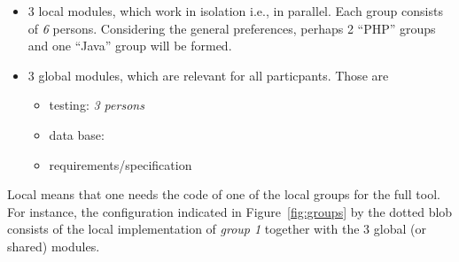 \documentclass[11pt,handout]{handout}
\begin{document}
\begin{itemize}
\item 3 local modules, which work in isolation i.e., in parallel.  Each
  group consists of \emph{6} persons. Considering the general preferences,
  perhaps 2 ``PHP'' groups and one ``Java'' group will be formed.
\item 3 global modules, which are relevant for all particpants. Those are
  \begin{itemize}
  \item testing: \emph{3 persons}
  \item data base: 
  \item requirements/specification
  \end{itemize}
\end{itemize}


Local means that one needs the code of one of the local groups for the full
tool. For instance, the configuration indicated in Figure~\ref{fig:groups}
by the dotted blob consists of the local implementation of \emph{group 1}
together with the 3 global (or shared) modules.

\medskip
\end{document}
